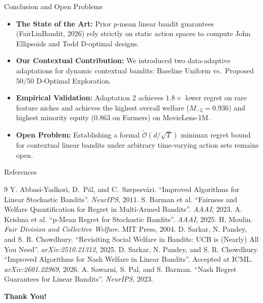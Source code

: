 \documentclass[11pt]{beamer}
\begin{document}
\begin{frame}{Conclusion and Open Problems}
  \small
  \begin{itemize}
    \item \textbf{The State of the Art:} Prior $p$-mean linear bandit guarantees (FairLinBandit, 2026) rely strictly on static action spaces to compute John Ellipsoids and Todd D-optimal designs.
    \item \textbf{Our Contextual Contribution:} We introduced two data-adaptive adaptations for dynamic contextual bandits: Baseline Uniform vs.\ Proposed 50/50 D-Optimal Exploration.
    \item \textbf{Empirical Validation:} Adaptation 2 achieves $1.8\times$ lower regret on rare feature niches and achieves the highest overall welfare ($M_{-2} = 0.936$) and highest minority equity ($0.863$ on Farmers) on MovieLens-1M.
    \item \textbf{Open Problem:} Establishing a formal $\tilde{\mathcal{O}}(d/\sqrt{T})$ minimax regret bound for contextual linear bandits under arbitrary time-varying action sets remains open.
  \end{itemize}
\end{frame}

\begin{frame}{References}
  \footnotesize
  \begin{thebibliography}{9}
     Y. Abbasi-Yadkori, D.~P\'al, and C.~Szepesv\'ari. ``Improved Algorithms for Linear Stochastic Bandits''. \textit{NeurIPS}, 2011.
     S. Barman et al. ``Fairness and Welfare Quantification for Regret in Multi-Armed Bandits''. \textit{AAAI}, 2023.
     A. Krishna et al. ``p-Mean Regret for Stochastic Bandits''. \textit{AAAI}, 2025.
     H. Moulin. \textit{Fair Division and Collective Welfare}. MIT Press, 2004.
     D. Sarkar, N. Pandey, and S. R. Chowdhury. ``Revisiting Social Welfare in Bandits: UCB is (Nearly) All You Need''. \textit{arXiv:2510.21312}, 2025.
     D. Sarkar, N. Pandey, and S. R. Chowdhury. ``Improved Algorithms for Nash Welfare in Linear Bandits''. Accepted at ICML. \textit{arXiv:2601.22969}, 2026.
     A. Sawarni, S. Pal, and S. Barman. ``Nash Regret Guarantees for Linear Bandits''. \textit{NeurIPS}, 2023.
  \end{thebibliography}
\end{frame}

\begin{frame}
  \centering
  \Large \textbf{Thank You!}
\end{frame}
\end{document}
